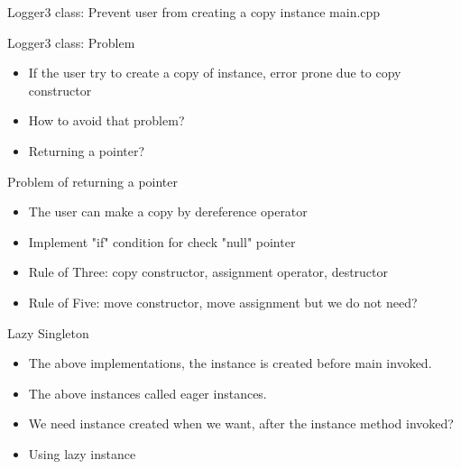 \documentclass[13pt]{beamer}
\begin{document}
\begin{frame}{Logger3 class: Prevent user from creating a copy instance}
main.cpp
\lstset{basicstyle=\tiny,style=myCustomCppStyle}

\end{frame}

\begin{frame}{Logger3 class: Problem}
\begin{itemize}
\setlength\itemsep{1em}

\item If the user try to create a copy of instance, error prone due to copy constructor

\item How to avoid that problem?

\item Returning a pointer?

\end{itemize}
\end{frame}

\begin{frame}{Problem of returning a pointer}
\begin{itemize}
\setlength\itemsep{1em}

\item The user can make a copy by dereference operator

\item Implement "if" condition for check "null" pointer

\item Rule of Three: copy constructor, assignment operator, destructor

\item Rule of Five: move constructor, move assignment but we do not need?

\end{itemize}
\end{frame}

\begin{frame}{Lazy Singleton}
\begin{itemize}
\setlength\itemsep{1em}

\item The above implementations, the instance is created before main invoked. 

\item The above instances called eager instances.

\item We need instance created when we want, after the instance method invoked?

\item Using lazy instance

\end{itemize}
\end{frame}
\end{document}
